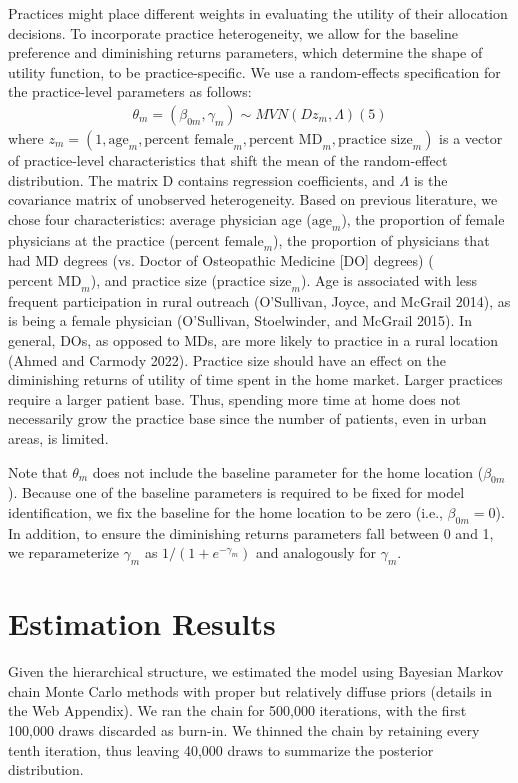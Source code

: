 \documentclass{article}
\begin{document}
Practices might place different weights in evaluating the utility of their allocation decisions. To incorporate practice heterogeneity, we allow for the baseline preference and diminishing returns parameters, which determine the shape of utility function, to be practice-specific. We use a random-effects specification for the practice-level parameters as follows:
\begin{align} \label{eq:2}
\theta_m = (\beta_{0m}, \gamma_m) \sim MVN(D z_m, \Lambda) (5)
\end{align}
where $z_m = (1, \text{age}_m, \text{percent female}_m, \text{percent MD}_m, \text{practice size}_m)$ is a vector of practice-level characteristics that shift the mean of the random-effect distribution. The matrix D contains regression coefficients, and $\Lambda$ is the covariance matrix of unobserved heterogeneity. Based on previous literature, we chose four characteristics: average physician age ($\text{age}_m$), the proportion of female physicians at the practice ($\text{percent female}_m$), the proportion of physicians that had MD degrees (vs. Doctor of Osteopathic Medicine [DO] degrees) ($\text{percent MD}_m$), and practice size ($\text{practice size}_m$). Age is associated with less frequent participation in rural outreach (O'Sullivan, Joyce, and McGrail 2014), as is being a female physician (O'Sullivan, Stoelwinder, and McGrail 2015). In general, DOs, as opposed to MDs, are more likely to practice in a rural location (Ahmed and Carmody 2022). Practice size should have an effect on the diminishing returns of utility of time spent in the home market. Larger practices require a larger patient base. Thus, spending more time at home does not necessarily grow the practice base since the number of patients, even in urban areas, is limited.

Note that $\theta_m$ does not include the baseline parameter for the home location ($\beta_{0m}$). Because one of the baseline parameters is required to be fixed for model identification, we fix the baseline for the home location to be zero (i.e., $\beta_{0m} = 0$). In addition, to ensure the diminishing returns parameters fall between 0 and 1, we reparameterize $\gamma_m$ as $1/(1 + e^{-\gamma_m})$ and analogously for $\gamma_m$.

\section*{Estimation Results}

Given the hierarchical structure, we estimated the model using Bayesian Markov chain Monte Carlo methods with proper but relatively diffuse priors (details in the Web Appendix). We ran the chain for 500,000 iterations, with the first 100,000 draws discarded as burn-in. We thinned the chain by retaining every tenth iteration, thus leaving 40,000 draws to summarize the posterior distribution.
\end{document}
